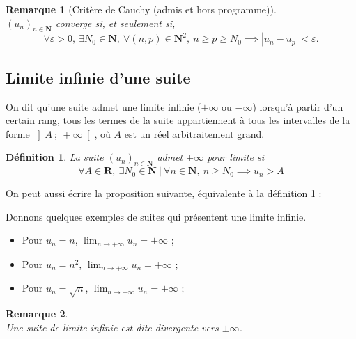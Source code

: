 \documentclass[12pt,a4paper]{article}
\newcommand{\R}{\mathbf{R}}
\newcommand{\N}{\mathbf{N}}
\newcommand{\vabs}[1]{\left\lvert #1 \right\rvert}
\newcommand{\ioo}[2]{\left]#1~;~#2\right[}
\theoremstyle{break}
\newtheorem{definition}{Définition}
\theoremstyle{plain}
\theoremstyle{nonumberplain}
\newtheorem{remarque}{Remarque}
\theoremstyle{nonumberbreak}
\begin{document}
\begin{remarque}[Critère de Cauchy (admis et hors programme)]~\\
  $(u_n)_{n\in\N}$ converge si, et seulement si, \[\forall \varepsilon >
  0,\ \exists N_0\in\N,\ \forall (n,p)\in\N^2,\ n\geq p\geq N_0 \implies
\vabs{u_n - u_p} < \varepsilon. \]
\end{remarque}

\subsection{Limite infinie d'une suite}

On dit qu'une suite admet une limite infinie ($+\infty$ ou $-\infty$)
lorsqu'à partir d'un certain rang, tous les termes de la suite
appartiennent à tous les intervalles de la forme $\ioo{A}{+\infty}$, où
$A$ est un réel arbitraitement grand.

\begin{definition}\label{def:suiteinf:superieur}
  La suite $(u_n)_{n\in\N}$ admet $+\infty$ pour limite si \[ \forall
    A\in\R,\ \exists N_0\in\N\ |\ \forall n\in\N,\ n\geq N_0 \implies
  u_n > A \]
\end{definition}

On peut aussi écrire la proposition suivante, équivalente à la
définition \ref{def:suiteinf:superieur} :

\framebox{
  \begin{minipage}{0.99\linewidth}
    $\lim_{n\to+\infty} u_n = +\infty$ si et seulement si tout
    intervalle de la forme $[A; +\infty [$ contient aussi tous les termes de
    la suite à partir d'un certain rang.
  \end{minipage}
}

Donnons quelques exemples de suites qui présentent une limite infinie.

\begin{itemize}
  \item Pour $u_n = n$, $\lim_{n\to +\infty}u_n = +\infty$ ;
  \item Pour $u_n = {n^2}$, $\lim_{n\to +\infty}u_n = +\infty$ ;
  \item Pour $u_n = \sqrt{n}$, $\lim_{n\to +\infty}u_n = +\infty$ ;
\end{itemize}

\begin{remarque}~\\
  Une suite de limite infinie est dite divergente vers $\pm\infty$.
\end{remarque}
\end{document}
